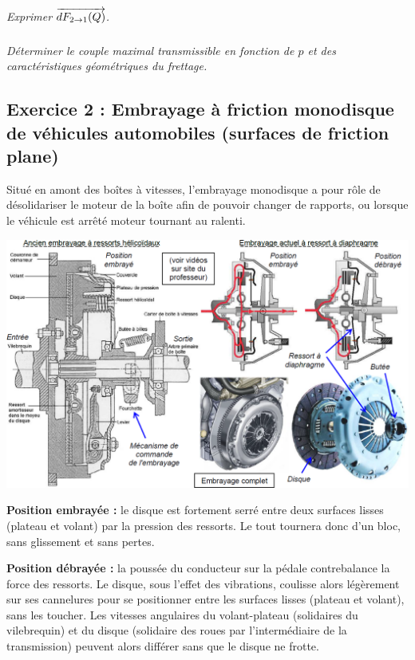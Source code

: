 \documentclass[10pt]{article}
\begin{document}
\subparagraph{}
\textit{Exprimer $\overrightarrow{dF_{2\rightarrow 1}(Q)}$.}

\subparagraph{}
\textit{Déterminer le couple maximal transmissible en fonction de $p$ et des 
caractéristiques géométriques du frettage.}


\subsection*{Exercice 2 : Embrayage à friction monodisque de véhicules automobiles (surfaces de friction plane)}
\setcounter{subparagraph}{0} 
Situé en amont des boîtes à vitesses, l'embrayage monodisque a pour rôle de désolidariser le moteur de la 
boîte afin de pouvoir changer de rapports, ou lorsque le véhicule est arrêté moteur tournant au ralenti. 

\begin{center}
\includegraphics[width=.9\textwidth]{images/fig_06}
\end{center}

\textbf{Position embrayée :} le disque est fortement serré entre deux surfaces lisses (plateau et volant) par la 
pression des ressorts. Le tout tournera donc d'un bloc, sans glissement et sans pertes. 

\textbf{Position débrayée :} la poussée du conducteur sur la pédale contrebalance la force des ressorts. Le disque, sous l'effet des vibrations, coulisse alors légèrement sur ses cannelures pour se positionner entre les surfaces lisses (plateau et volant), sans les toucher. Les vitesses angulaires du volant-plateau (solidaires du vilebrequin) et du disque (solidaire des roues par l'intermédiaire de la transmission) peuvent alors différer 
sans que le disque ne frotte. 
\end{document}
